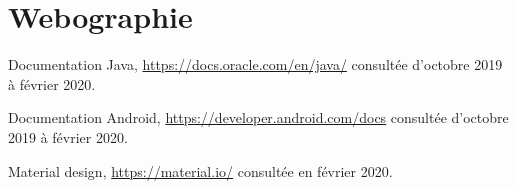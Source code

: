\section{Webographie}
Documentation Java, \href{https://docs.oracle.com/en/java/}{https://docs.oracle.com/en/java/} consultée d'octobre 2019
à février 2020.

\vspace{10pt}
Documentation Android, \href{https://developer.android.com/docs}{https://developer.android.com/docs} consultée d'octobre 2019
à février 2020.

\vspace{10pt}
Material design, \href{https://material.io/}{https://material.io/} consultée en février 2020.
